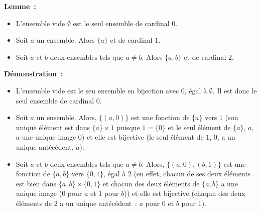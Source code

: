 \medskip

\noindent\textbf{Lemme :} 
    \begin{itemize}[nosep]
        \item L'ensemble vide $\emptyset$ est le seul ensemble de cardinal $0$.
        \item Soit $a$ un ensemble. 
            Alors $\lbrace a \rbrace$ et de cardinal $1$.
        \item Soit $a$ et $b$ deux ensembles tels que $a \neq b$. 
            Alors $\lbrace a, b \rbrace$ et de cardinal $2$.
    \end{itemize}

\medskip

\noindent\textbf{Démonstration :}

\begin{itemize}[nosep]
    \item L'ensemble vide est le seu ensemble en bijection avec $0$, égal à $\emptyset$. 
        Il est donc le seul ensemble de cardinal $0$.
    \item Soit $a$ un ensemble. 
        Alors, $\lbrace (a, 0) \rbrace$ est une fonction de $\lbrace a \rbrace$ vers $1$ (son unique élément est dans $\lbrace a \rbrace \times 1$ puisque $1 = \lbrace 0 \rbrace$ et le seul élément de $\lbrace a \rbrace$, $a$, a une unique image $0$) et elle est bijective (le seul élément de $1$, $0$, a un unique antécédent, $a$).
    \item Soit $a$ et $b$ deux ensembles tels que $a \neq b$.
        Alors, $\lbrace (a,0), (b,1) \rbrace$ est une fonction de $\lbrace a, b \rbrace$ vers $\lbrace 0, 1 \rbrace$, égal à $2$ (en effet, chacun de ses deux éléments est bien dans $\lbrace a, b \rbrace \times \lbrace 0, 1 \rbrace$ et chacun des deux éléments de $\lbrace a, b \rbrace$ a une unique image ($0$ pour $a$ et $1$ pour $b$)) et elle est bijective (chaqun des deux éléments de $2$ a un unique antécédent : $a$ pour $0$ et $b$ pour $1$).
\end{itemize}

\medskip

